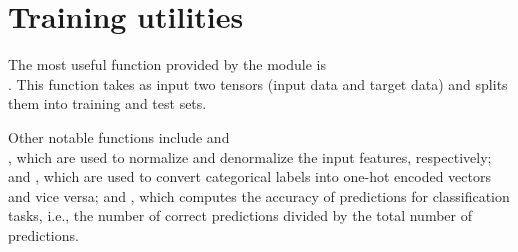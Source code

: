 \section{Training utilities} \label{sec:training-utilities}

The most useful function provided by the  module is\\. This function takes as input two tensors (input data and target data) and splits them into training and test sets.

Other notable functions include  and\\, which are used to normalize and denormalize the input features, respectively;  and , which are used to convert categorical labels into one-hot encoded vectors and vice versa; and , which computes the accuracy of predictions for classification tasks, i.e., the number of correct predictions divided by the total number of predictions.

